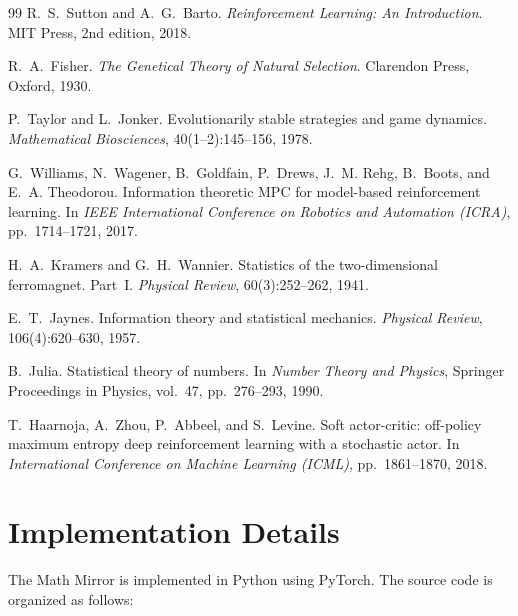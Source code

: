 \documentclass[11pt,a4paper]{article}
\begin{document}
\begin{thebibliography}{99}
R.~S.~Sutton and A.~G.~Barto.
\newblock \emph{Reinforcement Learning: An Introduction}.
\newblock MIT Press, 2nd edition, 2018.

R.~A.~Fisher.
\newblock \emph{The Genetical Theory of Natural Selection}.
\newblock Clarendon Press, Oxford, 1930.

P.~Taylor and L.~Jonker.
\newblock Evolutionarily stable strategies and game dynamics.
\newblock \emph{Mathematical Biosciences}, 40(1--2):145--156, 1978.

G.~Williams, N.~Wagener, B.~Goldfain, P.~Drews, J.~M. Rehg,
B.~Boots, and E.~A. Theodorou.
\newblock Information theoretic MPC for model-based
reinforcement learning.
\newblock In \emph{IEEE International Conference on Robotics
and Automation (ICRA)}, pp.~1714--1721, 2017.

H.~A.~Kramers and G.~H.~Wannier.
\newblock Statistics of the two-dimensional ferromagnet.
Part~I.
\newblock \emph{Physical Review}, 60(3):252--262, 1941.

E.~T.~Jaynes.
\newblock Information theory and statistical mechanics.
\newblock \emph{Physical Review}, 106(4):620--630, 1957.

B.~Julia.
\newblock Statistical theory of numbers.
\newblock In \emph{Number Theory and Physics},
Springer Proceedings in Physics, vol.~47, pp.~276--293, 1990.

T.~Haarnoja, A.~Zhou, P.~Abbeel, and S.~Levine.
\newblock Soft actor-critic: off-policy maximum entropy deep
reinforcement learning with a stochastic actor.
\newblock In \emph{International Conference on Machine Learning
(ICML)}, pp.~1861--1870, 2018.

\end{thebibliography}

\appendix

\section{Implementation Details}\label{app:impl}

The Math Mirror is implemented in Python using PyTorch.
The source code is organized as follows:
\end{document}
